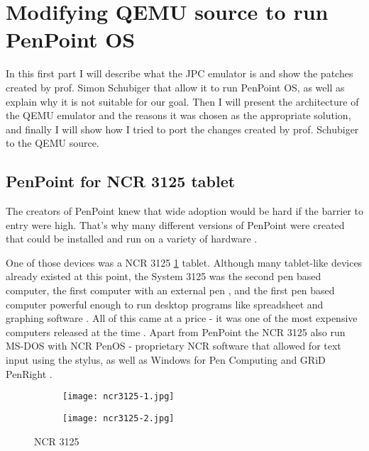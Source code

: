 \clearpage %

\section{Modifying QEMU source to run PenPoint OS}

In this first part I will describe what the JPC emulator is and show the
patches created by prof. Simon Schubiger that allow it to run PenPoint OS, as
well as explain why it is not suitable for our goal. Then I will present the
architecture of the QEMU emulator and the reasons it was chosen as the
appropriate solution, and finally I will show how I tried to port the changes
created by prof. Schubiger to the QEMU source.

\subsection{PenPoint for NCR 3125 tablet}

The creators of PenPoint knew that wide adoption would be hard if the barrier
to entry were high. That's why many different versions of PenPoint were created
that could be installed and run on a variety of hardware \cite{carr1991}.

One of those devices was a NCR 3125 \ref{fig:ncr3125} tablet. Although many
tablet-like devices already existed at this point, the System 3125 was the
second pen based computer, the first computer with an external pen
\cite{hohl2014}, and the first pen based computer powerful enough to run
desktop programs like spreadsheet and graphing software \cite{mcdonald2011}.
All of this came at a price - it was one of the most expensive computers
released at the time \cite{hohl2014}. Apart from PenPoint the NCR 3125 also run
MS-DOS with NCR PenOS - proprietary NCR software that allowed for text input
using the stylus, as well as Windows for Pen Computing and GRiD PenRight
\cite{stengel}.

\begin{figure}[!h]
    \centering
    \begin{subfigure}[b]{0.55\linewidth}
        \texttt{[image: ncr3125-1.jpg]}
    \end{subfigure}
    \hfill
    \begin{subfigure}[b]{0.35\linewidth}
        \texttt{[image: ncr3125-2.jpg]}
    \end{subfigure}
    \caption{NCR 3125}
    \label{fig:ncr3125}
\end{figure}

